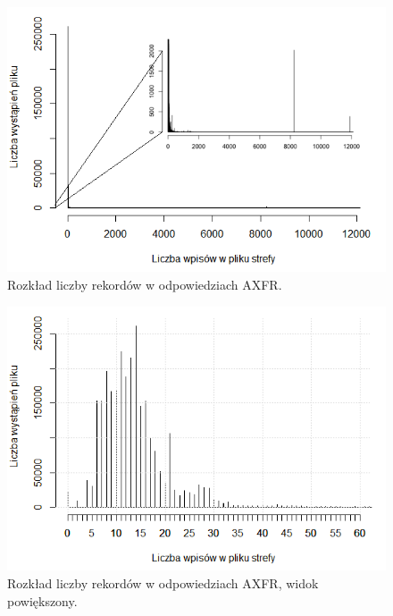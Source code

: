 \begin{figure}[h]
	\centering
	\includegraphics[width=1.0\textwidth]{image/hist_zone_size_no_title}
	\caption{Rozkład liczby rekordów w odpowiedziach AXFR.}
	\label{fig:hist_zone_size}
\end{figure}

\begin{figure}[h]
\centering
\includegraphics[width=1.0\textwidth]{image/hist_zone_size_zoom_no_title}
\caption{Rozkład liczby rekordów w odpowiedziach AXFR, widok powiększony.}
\label{fig:hist_zone_size_zoom}
\end{figure}

